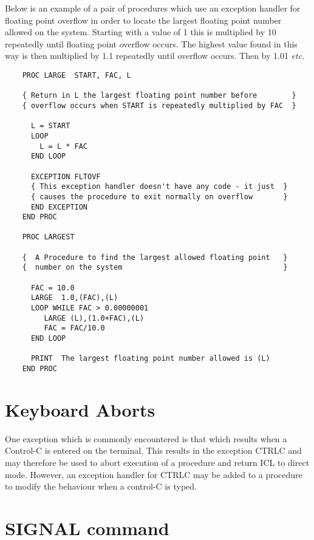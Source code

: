 Below is an example of a pair of procedures which use an exception handler
for floating point overflow in order to locate the largest floating point 
number allowed on the system. Starting with a value of 1 this is multiplied
by 10 repeatedly until floating point overflow occurs. The highest value
found in this way is then multiplied by 1.1 repeatedly until overflow occurs.
Then by 1.01 {\em etc.}

\begin{verbatim}
    PROC LARGE  START, FAC, L

    { Return in L the largest floating point number before        }
    { overflow occurs when START is repeatedly multiplied by FAC  }

      L = START
      LOOP
        L = L * FAC
      END LOOP
   
      EXCEPTION FLTOVF
      { This exception handler doesn't have any code - it just  }
      { causes the procedure to exit normally on overflow       }
      END EXCEPTION
    END PROC

    PROC LARGEST

    {  A Procedure to find the largest allowed floating point   }
    {  number on the system                                     }

      FAC = 10.0
      LARGE  1.0,(FAC),(L)
      LOOP WHILE FAC > 0.00000001
         LARGE (L),(1.0+FAC),(L)
         FAC = FAC/10.0
      END LOOP

      PRINT  The largest floating point number allowed is (L)
    END PROC
\end{verbatim}          



\section{Keyboard Aborts}

One exception which is commonly encountered is that which results when
a Control-C is entered on the terminal. This results in the exception
CTRLC and may therefore be used to abort execution of a procedure and 
return ICL to direct mode. However, an exception handler for CTRLC may
be added to a procedure to modify the behaviour when a control-C is
typed.

\section{SIGNAL command}


